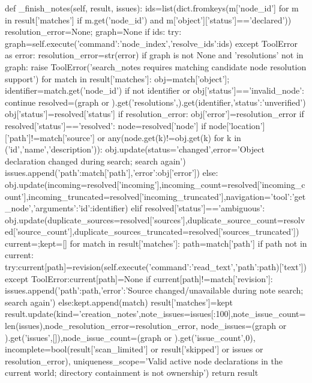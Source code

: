     def _finish_notes(self, result, issues):
        ids=list(dict.fromkeys(m['node_id'] for m in result['matches'] if m.get('node_id') and m['object']['status']=='declared'))
        resolution_error=None; graph=None
        if ids:
            try: graph=self.execute({'command':'node_index','resolve_ids':ids})
            except ToolError as error: resolution_error=str(error)
            if graph is not None and 'resolutions' not in graph:
                raise ToolError('search_notes requires matching candidate node resolution support')
        for match in result['matches']:
            obj=match['object']; identifier=match.get('node_id')
            if not identifier or obj['status']=='invalid_node': continue
            resolved=(graph or {}).get('resolutions',{}).get(identifier,{'status':'unverified'})
            obj['status']=resolved['status']
            if resolution_error: obj['error']=resolution_error
            if resolved['status']=='resolved':
                node=resolved['node']
                if node['location']['path']!=match['source'] or any(node.get(k)!=obj.get(k) for k in ('id','name','description')):
                    obj.update(status='changed',error='Object declaration changed during search; search again')
                    issues.append({'path':match['path'],'error':obj['error']})
                else:
                    obj.update(incoming=resolved['incoming'],incoming_count=resolved['incoming_count'],incoming_truncated=resolved['incoming_truncated'],navigation={'tool':'get_node','arguments':{'id':identifier}})
            elif resolved['status']=='ambiguous':
                obj.update(duplicate_sources=resolved['sources'],duplicate_source_count=resolved['source_count'],duplicate_sources_truncated=resolved['sources_truncated'])
        current={};kept=[]
        for match in result['matches']:
            path=match['path']
            if path not in current:
                try:current[path]=revision(self.execute({'command':'read_text','path':path})['text'])
                except ToolError:current[path]=None
            if current[path]!=match['revision']:
                issues.append({'path':path,'error':'Source changed/unavailable during note search; search again'})
            else:kept.append(match)
        result['matches']=kept
        result.update(kind='creation_notes',note_issues=issues[:100],note_issue_count=len(issues),node_resolution_error=resolution_error,
                      node_issues=(graph or {}).get('issues',[]),node_issue_count=(graph or {}).get('issue_count',0),
                      incomplete=bool(result['scan_limited'] or result['skipped'] or issues or resolution_error),
                      uniqueness_scope='Valid active node declarations in the current world; directory containment is not ownership')
        return result



